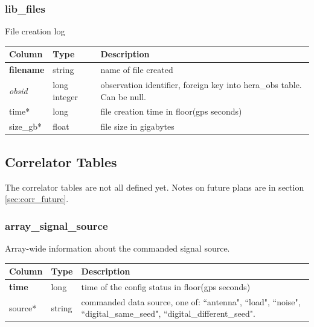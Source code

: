 \documentclass{article}
\begin{document}
{\subsubsection{lib\_files}
File creation log
\begin{center}
 \begin{tabular}{| p{4cm} | p{2cm} | p{10cm} |}
\hline
 {\bf Column} & {\bf Type}  & {\bf Description} \\ [0.5ex]  \hline\hline
\textbf{filename} & string & name of file created \\ \hline
\textit{obsid} & long integer & observation identifier, foreign key into hera\_obs table. Can be null. \\ \hline
time* & long & file creation time in floor(gps seconds)\\ \hline
size\_gb* & float & file size in gigabytes \\ \hline
\end{tabular}
\end{center}




\subsection{Correlator Tables}
The correlator tables are not all defined yet. Notes on future plans are in section \ref{sec:corr_future}.

\subsubsection{array\_signal\_source}
Array-wide information about the commanded signal source.
\begin{center}
 \begin{tabular}{| p{4cm} | p{2cm} | p{10cm} |}
\hline
 {\bf Column} & {\bf Type}  & {\bf Description} \\ [0.5ex]  \hline\hline
\textbf{time} & long & time of the config status in floor(gps seconds)\\ \hline
source* & string & commanded data source, one of: ``antenna", ``load", ``noise", ``digital\_same\_seed", ``digital\_different\_seed".
\\ \hline
\end{tabular}
\end{center}

}
\end{document}
